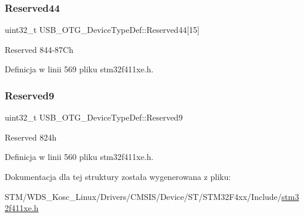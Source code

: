 \subsubsection{\texorpdfstring{Reserved44}{Reserved44}}
{\footnotesize\ttfamily uint32\+\_\+t U\+S\+B\+\_\+\+O\+T\+G\+\_\+\+Device\+Type\+Def\+::\+Reserved44\mbox{[}15\mbox{]}}

Reserved 844-\/87\+Ch 

Definicja w linii 569 pliku stm32f411xe.\+h.

\mbox{\label{struct_u_s_b___o_t_g___device_type_def_a7d7b3f7c72c92856e77d149c43200709}} 
\subsubsection{\texorpdfstring{Reserved9}{Reserved9}}
{\footnotesize\ttfamily uint32\+\_\+t U\+S\+B\+\_\+\+O\+T\+G\+\_\+\+Device\+Type\+Def\+::\+Reserved9}

Reserved 824h 

Definicja w linii 560 pliku stm32f411xe.\+h.



Dokumentacja dla tej struktury została wygenerowana z pliku\+:\begin{DoxyCompactItemize}
\item 
S\+T\+M/\+W\+D\+S\+\_\+\+Kosc\+\_\+\+Linux/\+Drivers/\+C\+M\+S\+I\+S/\+Device/\+S\+T/\+S\+T\+M32\+F4xx/\+Include/\hyperlink{stm32f411xe_8h}{stm32f411xe.\+h}\end{DoxyCompactItemize}
